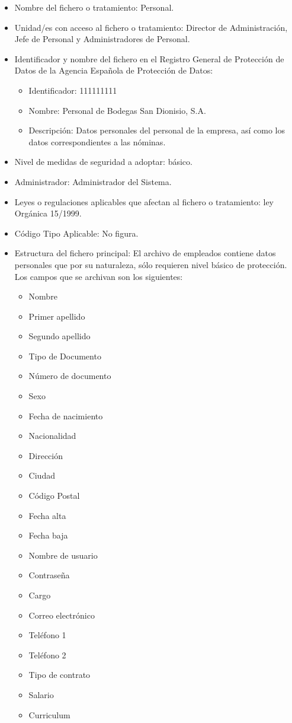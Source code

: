 \documentclass[a4paper,11pt,bibtotoc,noliststotoc]{scrbook}
\newcommand{\laorganizacion}{Bodegas San Dionisio, S.A.}
\begin{document}
\begin{itemize}
\item Nombre del fichero o tratamiento: Personal.

\item Unidad/es con acceso al fichero o tratamiento: Director de Administración, Jefe de Personal y Administradores de Personal.

\item Identificador y nombre del fichero en el Registro General de Protección de Datos de la Agencia Española de Protección de Datos:

	\begin{itemize}
	\item Identificador: 111111111
	\item Nombre: Personal de \laorganizacion
	\item Descripción: Datos personales del personal de la empresa, así como los datos correspondientes a las nóminas.
	\end{itemize}

\item Nivel de medidas de seguridad a adoptar: básico.

\item Administrador: Administrador del Sistema.

\item Leyes o regulaciones aplicables que afectan al fichero o tratamiento: ley Orgánica 15/1999.

\item Código Tipo Aplicable: No figura.

\item Estructura del fichero principal: 
El archivo de empleados contiene datos personales que por su naturaleza, sólo requieren nivel básico de protección. Los campos que se archivan son los siguientes:
\begin{itemize}
\item Nombre
\item Primer apellido
\item Segundo apellido
\item Tipo de Documento
\item Número de documento
\item Sexo
\item Fecha de nacimiento
\item Nacionalidad
\item Dirección
\item Ciudad
\item Código Postal
\item Fecha alta
\item Fecha baja
\item Nombre de usuario
\item Contraseña
\item Cargo
\item Correo electrónico
\item Teléfono 1
\item Teléfono 2
\item Tipo de contrato
\item Salario
\item Curriculum
\end{itemize}



\end{itemize}
\end{document}
